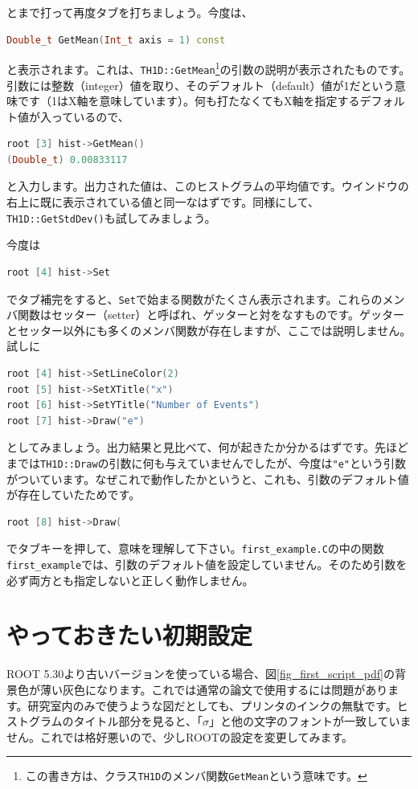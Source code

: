とまで打って再度タブを打ちましょう。今度は、
\begin{lstlisting}[language=c++]
Double_t GetMean(Int_t axis = 1) const
\end{lstlisting}
と表示されます。これは、\texttt{TH1D::GetMean}\footnote{この書き方は、クラス\texttt{TH1D}のメンバ関数\texttt{GetMean}という意味です。}の引数の説明が表示されたものです。引数には整数（integer）値を取り、そのデフォルト（default）値が1だという意味です（1はX軸を意味しています）。何も打たなくてもX軸を指定するデフォルト値が入っているので、
\begin{lstlisting}[language=c++]
root [3] hist->GetMean()
(Double_t) 0.00833117
\end{lstlisting}
と入力します。出力された値は、このヒストグラムの平均値です。ウインドウの右上に既に表示されている値と同一なはずです。同様にして、\texttt{TH1D::GetStdDev()}も試してみましょう。

今度は
\begin{lstlisting}[language=c++]
root [4] hist->Set
\end{lstlisting}
でタブ補完をすると、\texttt{Set}で始まる関数がたくさん表示されます。これらのメンバ関数はセッター（setter）と呼ばれ、ゲッターと対をなすものです。ゲッターとセッター以外にも多くのメンバ関数が存在しますが、ここでは説明しません。試しに
\begin{lstlisting}[language=c++]
root [4] hist->SetLineColor(2)
root [5] hist->SetXTitle("x")
root [6] hist->SetYTitle("Number of Events")
root [7] hist->Draw("e")
\end{lstlisting}
としてみましょう。出力結果と見比べて、何が起きたか分かるはずです。先ほどまでは\texttt{TH1D::Draw}の引数に何も与えていませんでしたが、今度は\texttt{"e"}という引数がついています。なぜこれで動作したかというと、これも、引数のデフォルト値が存在していたためです。
\begin{lstlisting}[language=c++]
root [8] hist->Draw(
\end{lstlisting}
でタブキーを押して、意味を理解して下さい。\texttt{first\_example.C}の中の関数\texttt{first\_example}では、引数のデフォルト値を設定していません。そのため引数を必ず両方とも指定しないと正しく動作しません。

\section{やっておきたい初期設定}

ROOT 5.30より古いバージョンを使っている場合、図\ref{fig_first_script_pdf}の背景色が薄い灰色になります。これでは通常の論文で使用するには問題があります。研究室内のみで使うような図だとしても、プリンタのインクの無駄です。ヒストグラムのタイトル部分を見ると、「$\sigma$」と他の文字のフォントが一致していません。これでは格好悪いので、少しROOTの設定を変更してみます。


